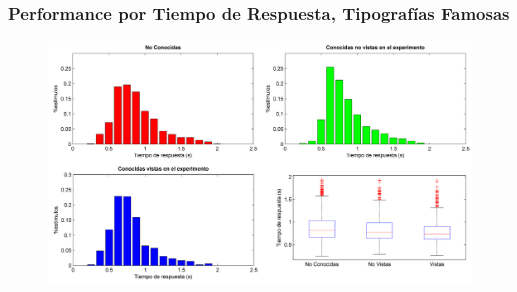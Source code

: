 \documentclass[10pt]{beamer}
\begin{document}
   	\begin{frame}
	\frametitle{Performance por Tiempo de Respuesta, Tipografías Famosas}
	    \begin{figure}
		\includegraphics[width=\textwidth]{graficos/tiempoRespuesta_PorFamosas.png}
	    \end{figure}
	\end{frame}
\end{document}
